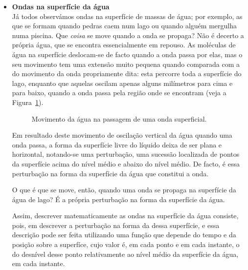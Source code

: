 \begin{itemize}
\item \textbf{Ondas na superfície da água}\\
    Já todos observámos ondas na superfície de massas de água; por exemplo, as
    que se formam quando pedras caem num lago ou quando alguém mergulha numa
    piscina. Que \emph{coisa} se move quando a onda se propaga? Não é decerto a
    própria água, que se encontra essencialmente em repouso. As moléculas de
    água na superfície deslocam-se de facto quando a onda passa por elas, mas o
    seu movimento tem uma extensão muito pequena quando comparada com a do
    movimento da onda propriamente dita: esta percorre toda a superfície do
    lago, enquanto que aquelas oscilam apenas alguns milímetros para cima e para
    baixo, quando a onda passa pela região onde se encontram (veja a
    Figura~\ref{fig:20-010}).
    \begin{figure}[htb]
        {\centering
            
            \caption{Movimento da água na passagem de uma onda
                superficial.\label{fig:20-010}}

        }
    \end{figure}
    Em resultado deste movimento de oscilação vertical da água quando uma onda
    passa, a forma da superfície livre do líquido deixa de ser plana e
    horizontal, notando-se uma perturbação, uma sucessão localizada de pontos da
    superfície acima do nível médio e abaixo do nível médio. De facto, é essa
    perturbação na forma da superfície da água que constitui a onda.

    O que é que se move, então, quando uma onda se propaga na superfície da água
    de lago? É a própria perturbação na forma da superfície da água. 

    Assim, descrever matematicamente as ondas na superfície da água consiste,
    pois, em descrever a perturbação na forma da dessa superfície, e essa
    descrição pode ser feita utilizando uma função que depende do tempo e da
    posição sobre a superfíce, cujo valor é, em cada ponto e em cada instante, o
    do desnível desse ponto relativamente ao nível médio da superfície da água,
    em cada instante.


\end{itemize}
